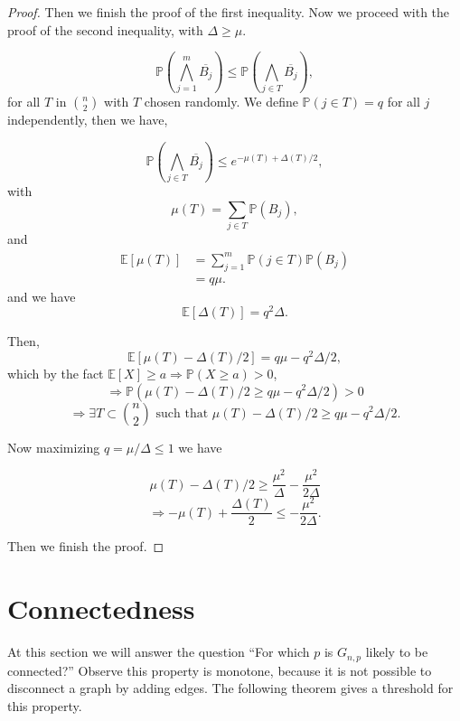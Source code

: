 \documentclass[12pt,twoside,a4paper]{book}
\numberwithin{equation}{section}
\theoremstyle{remark}
\begin{document}
\begin{proof}
Then we finish the proof of the first inequality. Now we proceed with the proof of the second inequality, with $\Delta \geq \mu$.

$$\mathbb{P}(\bigwedge_{j=1}^m \overline{B_j}) \leq \mathbb{P}(\bigwedge_{j \in T} \overline{B_j}),$$
for all $T$ in $\binom{n}{2}$ with $T$ chosen randomly. We define $\mathbb{P}(j \in T) = q$ for all $j$ independently, then we have,

$$ \mathbb{P}(\bigwedge_{j \in T} \overline{B_j}) \leq e^{- \mu(T) + \Delta(T)/2},$$
with
 $$\mu(T) = \sum_{j \in T} \mathbb{P}(B_j),$$
 and
 \begin{align*}
 \mathbb{E} [\mu(T)] &= \sum^m_{j=1} \mathbb{P}(j\in T) \mathbb{P} (B_j)\\
& = q\mu .
 \end{align*}
 and we have
 $$ \mathbb{E}[\Delta(T)] = q^2\Delta.$$
 
 Then,
 $$\mathbb{E}[\mu(T) - \Delta(T)/2] = q\mu - q^2 \Delta/2,$$
 which by the fact $\mathbb{E}[X] \geq a \Rightarrow \mathbb{P}(X\geq a) > 0$,
 $$\Rightarrow \mathbb{P}(\mu(T) - \Delta(T)/2 \geq q\mu - q^2 \Delta / 2) > 0$$
 $$\Rightarrow \exists T \subset \binom{n}{2}\text{ such that } \mu(T) - \Delta(T)/2 \geq q\mu - q^2 \Delta / 2 .$$
 
Now maximizing $q = \mu / \Delta \leq 1$ we have

 $$ \mu(T) - \Delta(T)/2 \geq \frac{\mu^2}{\Delta} - \frac{\mu^2}{2\Delta}$$
 $$\Rightarrow -\mu(T) + \frac{\Delta(T)}{2} \leq -\frac{\mu^2}{2\Delta}.$$
 
 Then we finish the proof.
 
\end{proof}

\section{Connectedness}
At this section we will answer the question ``For which $p$ is $G_{n,p}$ likely to be connected?'' Observe this property is monotone, because it is not possible to disconnect a graph by adding edges. The following theorem gives a threshold for this property.
\end{document}
